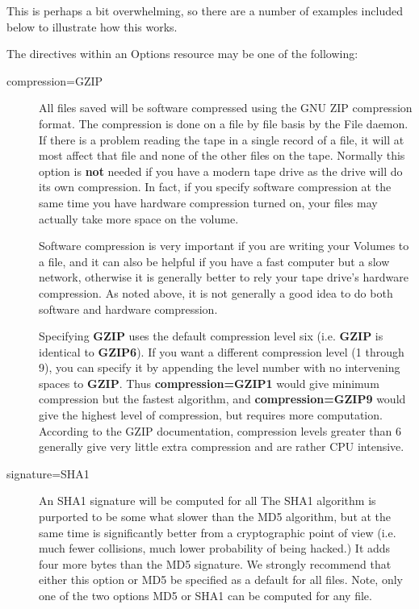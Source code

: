 This is perhaps a bit overwhelming, so there are a number of examples included 
below to illustrate how this works.

The directives within an Options resource may be one of the following: 

\begin{description}

\item [compression=GZIP]
   All files saved will be software compressed using the GNU ZIP compression
   format. The  compression is done on a file by file basis by the File daemon. 
   If there is a problem reading the tape in a  single record of a file, it will
   at most affect that file and none  of the other files on the tape. Normally
   this option is {\bf not} needed  if you have a modern tape drive as the drive
   will do its own  compression. In fact, if you specify software compression at
   the same time you have hardware compression turned on, your files  may
   actually take more space on the volume.  

   Software compression is very important if you are writing  your Volumes to a
   file, and it can also be helpful if you have a fast computer but a slow
   network, otherwise it is generally better to rely your tape drive's hardware
   compression. As noted above, it is not generally a good idea to do both software 
   and hardware compression.

   Specifying {\bf GZIP} uses the default compression level six (i.e. {\bf GZIP}
   is identical to {\bf GZIP6}). If you  want a different compression level (1
   through 9), you can specify  it by appending the level number with no
   intervening spaces  to {\bf GZIP}. Thus {\bf compression=GZIP1} would give
   minimum  compression but the fastest algorithm, and {\bf compression=GZIP9} 
   would give the highest level of compression, but requires more  computation.
   According to the GZIP documentation, compression levels  greater than 6
   generally give very little extra compression and are rather CPU intensive. 

\item [signature=SHA1]
   An SHA1 signature will be computed for all  The SHA1 algorithm is purported to
   be some  what slower than the MD5 algorithm, but at the same time is 
   significantly better from a cryptographic point of view (i.e.  much fewer
   collisions, much lower probability of being hacked.)  It adds four more bytes
   than the MD5 signature.  We strongly recommend that either this option  or MD5
   be specified as a default for all files. Note, only  one of the two options
   MD5 or SHA1 can be computed for any file. 


\end{description}
